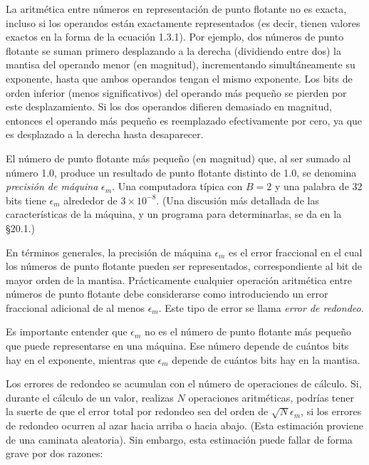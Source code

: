 \documentclass[10pt,a4paper]{book}
\begin{document}
\medskip

La aritmética entre números en representación de punto flotante no es exacta, incluso si los operandos están exactamente representados (es decir, tienen valores exactos en la forma de la ecuación 1.3.1). Por ejemplo, dos números de punto flotante se suman primero desplazando a la derecha (dividiendo entre dos) la mantisa del operando menor (en magnitud), incrementando simultáneamente su exponente, hasta que ambos operandos tengan el mismo exponente. Los bits de orden inferior (menos significativos) del operando más pequeño se pierden por este desplazamiento. Si los dos operandos difieren demasiado en magnitud, entonces el operando más pequeño es reemplazado efectivamente por cero, ya que es desplazado a la derecha hasta desaparecer.

\medskip

El número de punto flotante más pequeño (en magnitud) que, al ser sumado al número 1.0, produce un resultado de punto flotante distinto de 1.0, se denomina \textit{precisión de máquina} \( \epsilon_m \). Una computadora típica con \( B = 2 \) y una palabra de 32 bits tiene \( \epsilon_m \) alrededor de \( 3 \times 10^{-8} \). (Una discusión más detallada de las características de la máquina, y un programa para determinarlas, se da en la \S20.1.)

\medskip

En términos generales, la precisión de máquina \( \epsilon_m \) es el error fraccional en el cual los números de punto flotante pueden ser representados, correspondiente al bit de mayor orden de la mantisa. Prácticamente cualquier operación aritmética entre números de punto flotante debe considerarse como introduciendo un error fraccional adicional de al menos \( \epsilon_m \). Este tipo de error se llama \textit{error de redondeo}.

\medskip

Es importante entender que \( \epsilon_m \) no es el número de punto flotante más pequeño que puede representarse en una máquina. Ese número depende de cuántos bits hay en el exponente, mientras que \( \epsilon_m \) depende de cuántos bits hay en la mantisa.

\medskip

Los errores de redondeo se acumulan con el número de operaciones de cálculo. Si, durante el cálculo de un valor, realizas \( N \) operaciones aritméticas, podrías tener la suerte de que el error total por redondeo sea del orden de \( \sqrt{N} \epsilon_m \), si los errores de redondeo ocurren al azar hacia arriba o hacia abajo. (Esta estimación proviene de una caminata aleatoria). Sin embargo, esta estimación puede fallar de forma grave por dos razones:
\end{document}
